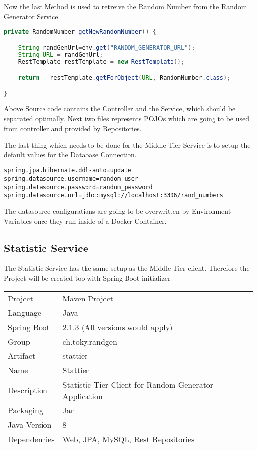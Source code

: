 Now the last Method is used to retreive the Random Number from the Random Generator Service.
\begin{lstlisting}[language=Java]
private RandomNumber getNewRandomNumber() {

    String randGenUrl=env.get("RANDOM_GENERATOR_URL");
    String URL = randGenUrl;
    RestTemplate restTemplate = new RestTemplate();

    return   restTemplate.getForObject(URL, RandomNumber.class);

}
\end{lstlisting}
Above Source code contains the Controller and the Service, which should be separated optimally.
Next two files represents POJOs which are going to be used from controller and provided by Repositories.

The last thing which needs to be done for the Middle Tier Service is to setup the default values for the Database Connection.
\begin{lstlisting}[language=Properties]
spring.jpa.hibernate.ddl-auto=update
spring.datasource.username=random_user
spring.datasource.password=random_password
spring.datasource.url=jdbc:mysql://localhost:3306/rand_numbers
\end{lstlisting}
The datasource configurations are going to be overwritten by Environment Variables once they run inside of a Docker Container.



\subsection{Statistic Service}
The Statistic Service has the same setup as the Middle Tier client.
Therefore the Project will be created too with Spring Boot initializer.
\begin{tabbing}
\begin{tabular}{ll}
Project & Maven Project \\
Language & Java \\
Spring Boot & 2.1.3 (All versions would apply) \\
Group & ch.toky.randgen \\
Artifact & stattier \\
Name & Stattier \\
Description & Statistic Tier Client for Random Generator Application \\
Packaging & Jar \\
Java Version & 8 \\
Dependencies & Web, JPA, MySQL, Rest Repositories
\end{tabular}
\end{tabbing}

